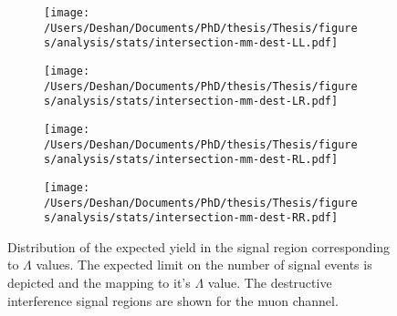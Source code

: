 \begin{figure}[h!]
    \centering
    \begin{subfigure}[b]{0.49\textwidth}
        \centering
        \texttt{[image: /Users/Deshan/Documents/PhD/thesis/Thesis/figures/analysis/stats/intersection-mm-dest-LL.pdf]}
        \label{fig:bkgmodel:interpmm5}
    \end{subfigure}
    \begin{subfigure}[b]{0.49\textwidth}
        \centering
        \texttt{[image: /Users/Deshan/Documents/PhD/thesis/Thesis/figures/analysis/stats/intersection-mm-dest-LR.pdf]}
        \label{fig:bkgmodel:interpmm6}
    \end{subfigure}
    \begin{subfigure}[b]{0.49\textwidth}
        \centering
        \texttt{[image: /Users/Deshan/Documents/PhD/thesis/Thesis/figures/analysis/stats/intersection-mm-dest-RL.pdf]}
        \label{fig:bkgmodel:interpmm7}
    \end{subfigure}
    \begin{subfigure}[b]{0.49\textwidth}
        \centering
        \texttt{[image: /Users/Deshan/Documents/PhD/thesis/Thesis/figures/analysis/stats/intersection-mm-dest-RR.pdf]}
        \label{fig:bkgmodel:interpmm8}
    \end{subfigure}
    \caption{Distribution of the expected yield in the signal region corresponding to $\Lambda$ values. The expected limit on the number of signal events is depicted and the mapping to it's $\Lambda$ value. The destructive interference signal regions are shown for the muon channel.}
    \label{fig:stats:interpmmdest}
\end{figure}

